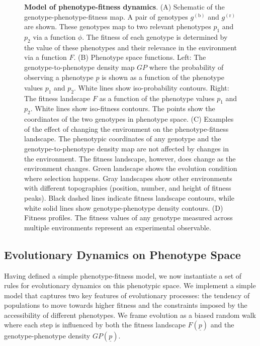 \documentclass[
]{scrartcl}
\begin{document}
\begin{refsegment}
\begin{figure}
\caption{\label{fig-01}\textbf{Model of phenotype-fitness dynamics}. (A)
Schematic of the genotype-phenotype-fitness map. A pair of genotypes
\(g^{(\text{b})}\) and \(g^{(\text{r})}\) are shown. These genotypes map
to two relevant phenotypes \(p_1\) and \(p_2\) via a function \(\phi\).
The fitness of each genotype is determined by the value of these
phenotypes and their relevance in the environment via a function \(F\).
(B) Phenotype space functions. Left: The genotype-to-phenotype density
map \(GP\) where the probability of observing a phenotype
\(\underline{p}\) is shown as a function of the phenotype values \(p_1\)
and \(p_2\). White lines show iso-probability contours. Right: The
fitness landscape \(F\) as a function of the phenotype values \(p_1\)
and \(p_2\). White lines show iso-fitness contours. The points show the
coordinates of the two genotypes in phenotype space. (C) Examples of the
effect of changing the environment on the phenotype-fitness landscape.
The phenotypic coordinates of any genotype and the genotype-to-phenotype
density map are not affected by changes in the environment. The fitness
landscape, however, does change as the environment changes. Green
landscape shows the evolution condition where selection happens. Gray
landscapes show other environments with different topographies
(position, number, and height of fitness peaks). Black dashed lines
indicate fitness landscape contours, while white solid lines show
genotype-phenotype density contours. (D) Fitness profiles. The fitness
values of any genotype measured across multiple environments represent
an experimental observable.}

\end{figure}%

\subsection{Evolutionary Dynamics on Phenotype
Space}\label{evolutionary-dynamics-on-phenotype-space}

Having defined a simple phenotype-fitness model, we now instantiate a
set of rules for evolutionary dynamics on this phenotypic space. We
implement a simple model that captures two key features of evolutionary
processes: the tendency of populations to move towards higher fitness
and the constraints imposed by the accessibility of different
phenotypes. We frame evolution as a biased random walk where each step
is influenced by both the fitness landscape \(F(\underline{p})\) and the
genotype-phenotype density \(GP(\underline{p})\).


\end{refsegment}
\end{document}
